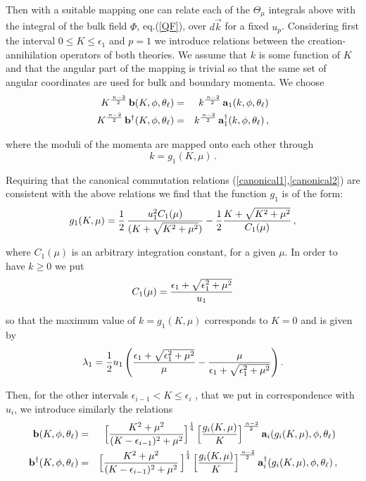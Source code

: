 \documentclass[a4paper,12pt]{article}
\begin{document}
Then with a suitable mapping one can relate each of the $\Theta_\mu$
integrals above with the integral of the bulk field $\Phi$, eq.(\ref{QF}),
 over $d \vec k $ for a fixed $u_p$. Considering first the  interval 
$0 \le  K \le \epsilon_1 $  and $ p = 1 $ we introduce 
relations between the creation-annihilation operators of both theories.
We assume that  $ k$ is some  function of $ K$ and that the angular part of 
the mapping is trivial so that the same set of angular coordinates 
are used for bulk and boundary momenta. 
We choose
\begin{eqnarray}
K^{\,{n-2}\over 2} \,{\bf b}( K , \phi , \theta_\ell ) 
&=& k^{\,{n-2}\over 2}\,{\bf a}_1 (  k, \phi , \theta_\ell  ) \nonumber\\
K^{\,{n-2}\over 2}\,{\bf b}^\dagger ( K , \phi , \theta_\ell ) 
&=& k^{\,{n-2}\over 2}\,{\bf a}^\dagger_1 (  k, \phi , \theta_\ell    )\,,
\end{eqnarray}

\noindent where the moduli of the  momenta are mapped onto each other through
\begin{equation}
 k = g_1 (K,\mu)\,.
\end{equation} 

Requiring  that the canonical commutation relations 
(\ref{canonical1},\ref{canonical2}) are consistent with the above relations 
we find that the function $g_1$ is of the form:
\begin{equation}
g_1 (K,\mu) = {1\over 2} \,{u_1^2 C_1(\mu) 
			\over ( K + \sqrt{K^2 + \mu^2})}
-{1\over 2} { K + \sqrt{K^2 + \mu^2}\over C_1(\mu)}\,,
\end{equation}

\noindent where $C_1(\mu)$ is an arbitrary integration constant, for a given $\mu$. 
In order to have  $k \ge 0$ we put
\begin{equation}
C_1(\mu) =  {\epsilon_1  +\sqrt{\epsilon_1^2 + \mu^2 }\over u_1}
\end{equation}

\noindent so that the maximum value of $k=g_{1}(K,\mu)$ corresponds to 
$K = 0 $ and is given by
\begin{equation}
\lambda_1 =  \frac 12 u_1 
\left({\epsilon_1  +\sqrt{\epsilon_1^2 + \mu^2 }\over \mu}
-{\mu \over \epsilon_1  +\sqrt{\epsilon_1^2 + \mu^2 }}\right).
\end{equation}
 

Then, for the other intervals $\epsilon_{i-1} <  K \le \epsilon_i $ , 
that we put in correspondence with  $u_i$,
we introduce similarly the relations
\begin{eqnarray}
 {\bf b}( K , \phi , \theta_\ell ) &=& \Big[ { K^2 + \mu^2 \over 
(K - \epsilon_{i-1})^2 + \mu^2 }\Big]^{1\over 4}\,
\Big[ { g_i(K,\mu) \over K}\Big]^{\,{n-2}\over 2}
\,{\bf a}_i ( g_i (K,\mu) , \phi , \theta_\ell) 
\,\nonumber\\
{\bf b}^\dagger ( K , \phi , \theta_\ell ) &=&
\Big[ { K^2 + \mu^2 \over 
(K - \epsilon_{i-1} )^2 + \mu^2 }\,\Big]^{1\over 4}\,
\Big[ {g_i (K, \mu)\over K}\Big]^{\,{n-2}\over 2}\,
{\bf a}^\dagger_i ( g_{i} (K,\mu) , \phi , \theta_\ell  )  \,,
\end{eqnarray}
\end{document}
